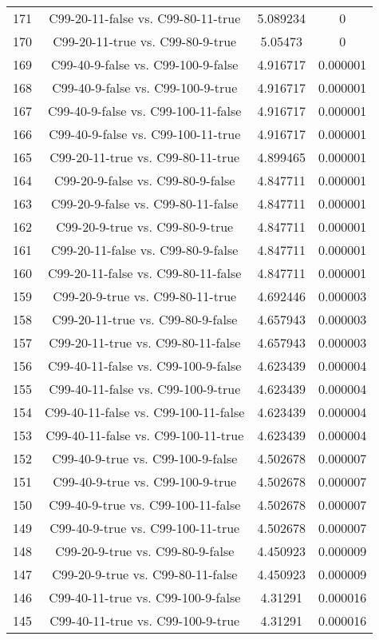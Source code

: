 \documentclass[a4paper,10pt]{article}
\begin{document}
\begin{landscape}
\begin{table}[!htp]
\begin{tabular}{cccc}
171&C99-20-11-false vs. C99-80-11-true&5.089234&0\\
170&C99-20-11-true vs. C99-80-9-true&5.05473&0\\
169&C99-40-9-false vs. C99-100-9-false&4.916717&0.000001\\
168&C99-40-9-false vs. C99-100-9-true&4.916717&0.000001\\
167&C99-40-9-false vs. C99-100-11-false&4.916717&0.000001\\
166&C99-40-9-false vs. C99-100-11-true&4.916717&0.000001\\
165&C99-20-11-true vs. C99-80-11-true&4.899465&0.000001\\
164&C99-20-9-false vs. C99-80-9-false&4.847711&0.000001\\
163&C99-20-9-false vs. C99-80-11-false&4.847711&0.000001\\
162&C99-20-9-true vs. C99-80-9-true&4.847711&0.000001\\
161&C99-20-11-false vs. C99-80-9-false&4.847711&0.000001\\
160&C99-20-11-false vs. C99-80-11-false&4.847711&0.000001\\
159&C99-20-9-true vs. C99-80-11-true&4.692446&0.000003\\
158&C99-20-11-true vs. C99-80-9-false&4.657943&0.000003\\
157&C99-20-11-true vs. C99-80-11-false&4.657943&0.000003\\
156&C99-40-11-false vs. C99-100-9-false&4.623439&0.000004\\
155&C99-40-11-false vs. C99-100-9-true&4.623439&0.000004\\
154&C99-40-11-false vs. C99-100-11-false&4.623439&0.000004\\
153&C99-40-11-false vs. C99-100-11-true&4.623439&0.000004\\
152&C99-40-9-true vs. C99-100-9-false&4.502678&0.000007\\
151&C99-40-9-true vs. C99-100-9-true&4.502678&0.000007\\
150&C99-40-9-true vs. C99-100-11-false&4.502678&0.000007\\
149&C99-40-9-true vs. C99-100-11-true&4.502678&0.000007\\
148&C99-20-9-true vs. C99-80-9-false&4.450923&0.000009\\
147&C99-20-9-true vs. C99-80-11-false&4.450923&0.000009\\
146&C99-40-11-true vs. C99-100-9-false&4.31291&0.000016\\
145&C99-40-11-true vs. C99-100-9-true&4.31291&0.000016\\

\end{tabular}
\end{table}
\end{landscape}
\end{document}
